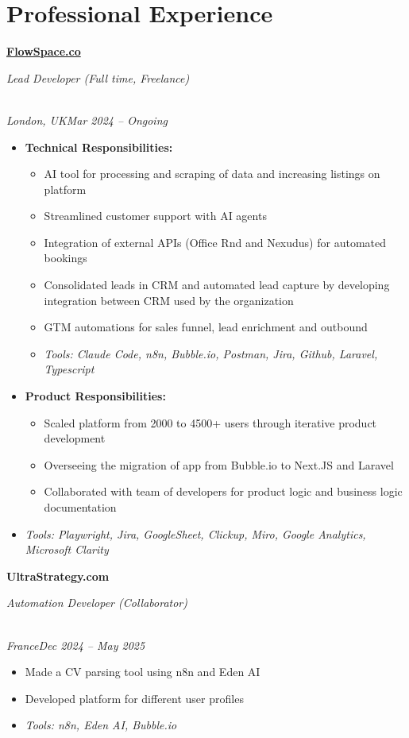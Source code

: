\documentclass[a4paper,10pt]{article}
\newcommand{\role}[4]{\vspace{3pt}\noindent\hspace{0.6em}\parbox[t]{0.38\textwidth}{\raggedright\textbf{#1}}\hfill\parbox[t]{0.58\textwidth}{\raggedleft\textit{#2}}\\{\textit{#3}\hfill\textit{#4}}\vspace{1pt}}
\begin{document}
\section{Professional Experience}
\role{\href{https://flowspace.co}{FlowSpace.co}}{Lead Developer (Full time, Freelance)}{London, UK}{Mar 2024 -- Ongoing}
\begin{itemize}
\item \textbf{Technical Responsibilities:}
\begin{itemize}[label=--]
\item AI tool for processing and scraping of data and increasing listings on platform
\item Streamlined customer support with AI agents
\item Integration of external APIs (Office Rnd and Nexudus) for automated bookings
\item Consolidated leads in CRM and automated lead capture by developing integration between CRM used by the organization
\item GTM automations for sales funnel, lead enrichment and outbound
\item \textit{Tools: Claude Code, n8n, Bubble.io, Postman, Jira, Github, Laravel, Typescript}
\end{itemize}
\item \textbf{Product Responsibilities:}
\begin{itemize}[label=--]
\item Scaled platform from 2000 to 4500+ users through iterative product development
\item Overseeing the migration of app from Bubble.io to Next.JS and Laravel
\item Collaborated with team of developers for product logic and business logic documentation
\end{itemize}
\item \textit{Tools: Playwright, Jira, GoogleSheet, Clickup, Miro, Google Analytics, Microsoft Clarity}
\end{itemize}

\role{UltraStrategy.com}{Automation Developer (Collaborator)}{France}{Dec 2024 -- May 2025}
\begin{itemize}
\item Made a CV parsing tool using n8n and Eden AI
\item Developed platform for different user profiles
\item \textit{Tools: n8n, Eden AI, Bubble.io}
\end{itemize}
\end{document}
